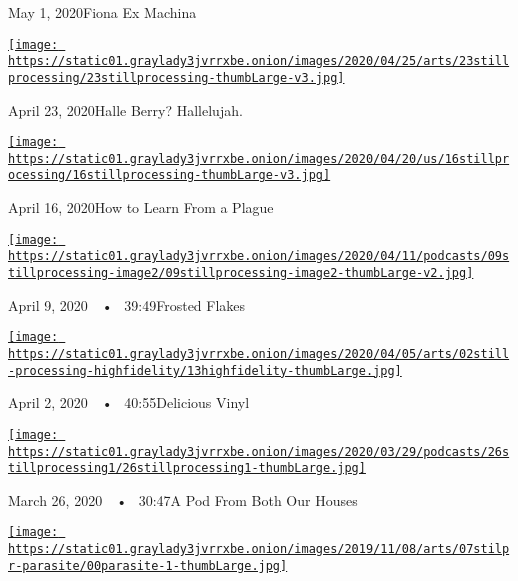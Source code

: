 May 1, 2020Fiona Ex Machina

\href{https://www.nytimes3xbfgragh.onion/2020/04/23/podcasts/still-processing-halle-berry-sharon-stone-catwoman-quarantine.html?action=click\&module=audio-series-bar\&region=header\&pgtype=Article}{\texttt{[image: https://static01.graylady3jvrrxbe.onion/images/2020/04/25/arts/23stillprocessing/23stillprocessing-thumbLarge-v3.jpg]}}

April 23, 2020Halle Berry? Hallelujah.

\href{https://www.nytimes3xbfgragh.onion/2020/04/16/podcasts/still-processing-AIDS-survive-coronavirus.html?action=click\&module=audio-series-bar\&region=header\&pgtype=Article}{\texttt{[image: https://static01.graylady3jvrrxbe.onion/images/2020/04/20/us/16stillprocessing/16stillprocessing-thumbLarge-v3.jpg]}}

April 16, 2020How to Learn From a Plague

\href{https://www.nytimes3xbfgragh.onion/2020/04/09/podcasts/still-processing-tiger-king.html?action=click\&module=audio-series-bar\&region=header\&pgtype=Article}{\texttt{[image: https://static01.graylady3jvrrxbe.onion/images/2020/04/11/podcasts/09stillprocessing-image2/09stillprocessing-image2-thumbLarge-v2.jpg]}}

April 9, 2020~~•~ 39:49Frosted Flakes

\href{https://www.nytimes3xbfgragh.onion/2020/04/02/podcasts/high-fidelity-zoe-kravitz.html?action=click\&module=audio-series-bar\&region=header\&pgtype=Article}{\texttt{[image: https://static01.graylady3jvrrxbe.onion/images/2020/04/05/arts/02still-processing-highfidelity/13highfidelity-thumbLarge.jpg]}}

April 2, 2020~~•~ 40:55Delicious Vinyl

\href{https://www.nytimes3xbfgragh.onion/2020/03/26/podcasts/still-processing-quarantine.html?action=click\&module=audio-series-bar\&region=header\&pgtype=Article}{\texttt{[image: https://static01.graylady3jvrrxbe.onion/images/2020/03/29/podcasts/26stillprocessing1/26stillprocessing1-thumbLarge.jpg]}}

March 26, 2020~~•~ 30:47A Pod From Both Our Houses

\href{https://www.nytimes3xbfgragh.onion/2019/11/07/podcasts/still-processing-parasite-watchmen-bong-joon-ho.html?action=click\&module=audio-series-bar\&region=header\&pgtype=Article}{\texttt{[image: https://static01.graylady3jvrrxbe.onion/images/2019/11/08/arts/07stilpr-parasite/00parasite-1-thumbLarge.jpg]}}

